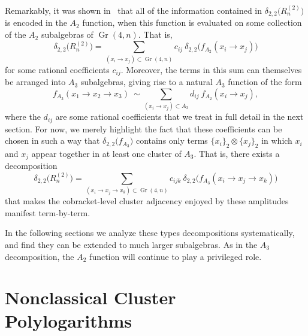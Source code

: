 \documentclass[12pt]{article}
\DeclareMathOperator{\Gr}{Gr}
\begin{document}
Remarkably, it was shown in~\cite{Golden:2014xqa} that all of the information contained in $\delta_{2,2}\big(R^{(2)}_n\big)$ is encoded in the $A_2$ function, when this function is evaluated on some collection of the $A_2$ subalgebras of $\Gr(4,n)$. That is,
\begin{equation}
\delta_{2,2}\big( R_n^{(2)} \big) = \! \sum_{(x_i\to x_j) \subset \Gr(4,n)} \! c_{ij}\ \delta_{2,2} \big(f_{A_2}(x_i \to x_j)\big) 
\end{equation}
for some rational coefficients $c_{ij}$. Moreover, the terms in this sum can themselves be arranged into $A_3$ subalgebras, giving rise to a natural $A_3$ function of the form
\begin{equation} \label{eq:a3_func_tilde}
 f_{A_3}(x_1 \to x_2 \to x_3) \ \sim \sum_{(x_i\to x_j) \subset A_3} d_{ij}\ f_{A_2}(x_i \to x_j), 
\end{equation}
where the $d_{ij}$ are some rational coefficients that we treat in full detail in the next section. For now, we merely highlight the fact that these coefficients can be chosen in such a way that $\delta_{2,2}\big(f_{A_3} \big)$ contains only terms $\{x_i\}_2 \otimes \{x_j \}_2$ in which $x_i$ and $x_j$ appear together in at least one cluster of $A_3$. That is, there exists a decomposition
\begin{equation} \label{eq:remainder_A3_deomposition}
 \delta_{2,2}\big( R_n^{(2)} \big) = \! \sum_{(x_i\to x_j \to x_k) \subset \Gr(4,n)}  \! c_{ijk}\ \delta_{2,2} \big(f_{A_3}(x_i \to x_j \to x_k)\big) 
\end{equation}
that makes the cobracket-level cluster adjacency enjoyed by these amplitudes manifest term-by-term.

In the following sections we analyze these types decompositions systematically, and find they can be extended to much larger subalgebras. As in the $A_3$ decomposition, the $A_2$ function will continue to play a privileged role.


\section{Nonclassical Cluster Polylogarithms}\label{sec:sub-constructibility} 
\end{document}
